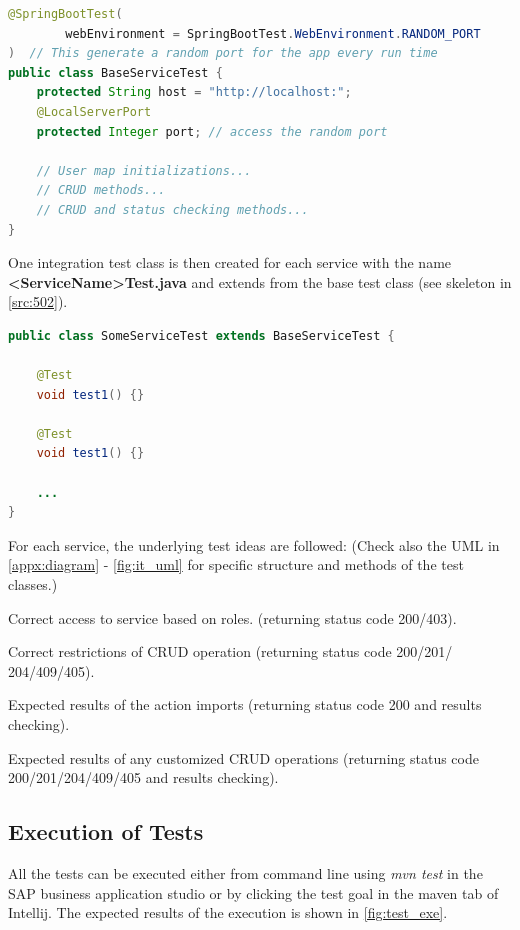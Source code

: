 \bigskip
{}
\begin{lstlisting}[language={java}]
@SpringBootTest(  
        webEnvironment = SpringBootTest.WebEnvironment.RANDOM_PORT  
)  // This generate a random port for the app every run time 
public class BaseServiceTest {  
    protected String host = "http://localhost:"; 
    @LocalServerPort  
    protected Integer port; // access the random port

    // User map initializations...
    // CRUD methods...
    // CRUD and status checking methods...
}
\end{lstlisting}


One integration test class is then created for each service with the name \textbf{<ServiceName>Test.java} and extends from the base test class (see skeleton in \autoref{src:502}). 

\begin{lstlisting}[language={java}]
public class SomeServiceTest extends BaseServiceTest {

	@Test
	void test1() {}
	
	@Test
	void test1() {}
	
	...
}
\end{lstlisting}

For each service, the underlying test ideas are followed: (Check also the UML in \autoref{appx:diagram} - \autoref{fig:it_uml} for specific structure and methods of the test classes.)
\begin{compactenum}
	\item Correct access to service based on roles. (returning status code 200/403).
    \item Correct restrictions of CRUD operation (returning status code 200/201/ 204/409/405).
    \item Expected results of the action imports (returning status code 200 and results checking).
    \item Expected results of any customized CRUD operations (returning status code 200/201/204/409/405 and results checking).
\end{compactenum}


\subsection{Execution of Tests}
\label{subsec:test-exe}
All the tests can be executed either from command line using \textit{mvn test} in the SAP business application studio or by clicking the test goal in the maven tab of Intellij. The expected results of the execution is shown in \autoref{fig:test_exe}.


